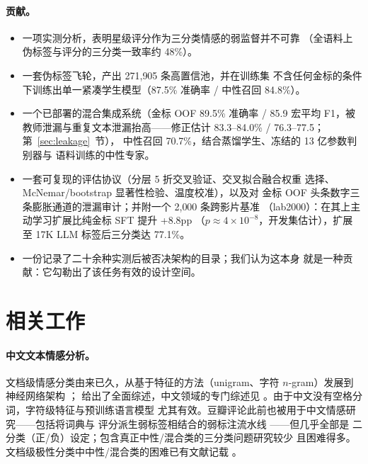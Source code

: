 \documentclass[11pt,a4paper]{article}
\begin{document}
\paragraph{贡献。}
\begin{itemize}
  
  \item 一项实测分析，表明星级评分作为三分类情感的弱监督并不可靠
        （全语料上伪标签与评分的三分类一致率约 48\%）。
  \item 一套伪标签飞轮，产出 271{,}905 条高置信池，并在训练集
        不含任何金标的条件下训练出单一紧凑学生模型（87.5\% 准确率 / 中性召回
        84.8\%）。
  \item 一个已部署的混合集成系统（金标 OOF 89.5\% 准确率 /
        85.9 宏平均 F1，被教师泄漏与重复文本泄漏抬高——修正估计 83.3--84.0\% /
        76.3--77.5；第~\ref{sec:leakage}~节），
        中性召回 70.7\%，结合蒸馏学生、冻结的 13 亿参数判别器与
        语料训练的中性专家。
  \item 一套可复现的评估协议（分层 5 折交叉验证、交叉拟合融合权重
        选择、McNemar/bootstrap 显著性检验、温度校准），以及对
        金标 OOF 头条数字三条膨胀通道的泄漏审计；并附一个
        2{,}000 条跨影片基准
        （lab2000）：在其上主动学习扩展比纯金标 SFT 提升 +8.8pp
        （$p \approx 4\times10^{-8}$，开发集估计），扩展至 17K LLM
        标签后三分类达 77.1\%。
  \item 一份记录了二十余种实测后被否决架构的目录；我们认为这本身
        就是一种贡献：它勾勒出了该任务有效的设计空间。
\end{itemize}

\section{相关工作}
\label{sec:related}

\paragraph{中文文本情感分析。}
文档级情感分类由来已久，从基于特征的方法（unigram、字符
$n$-gram）发展到神经网络架构 \citep{kim2014,socher2013,joulin2017,
reimers2019}；\citet{pang2008} 给出了全面综述，中文领域的专门综述见
\citet{tan2008}。由于中文没有空格分词，字符级特征与预训练语言模型
尤其有效。豆瓣评论此前也被用于中文情感研究——包括将词典与
评分派生弱标签相结合的弱标注流水线 \citep{fan2018}——但几乎全部是
二分类（正/负）设定；包含真正中性/混合类的三分类问题研究较少
且困难得多。文档级极性分类中中性/混合类的困难已有文献记载
\citep{martins2021}。
\end{document}
